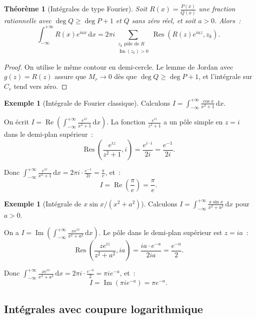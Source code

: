 \documentclass[12pt,a4paper,openany]{book}
\theoremstyle{definition}
\newtheorem{exemple}[definition]{Exemple}
\theoremstyle{plain}
\newtheorem{theoreme}[definition]{Théorème}
\theoremstyle{remark}
\DeclareMathOperator{\re}{Re}
\DeclareMathOperator{\im}{Im}
\DeclareMathOperator{\Res}{Res}
\newcommand{\dd}{\mathrm{d}}
\begin{document}
\begin{theoreme}[Intégrales de type Fourier]\label{thm:int-fourier}
Soit $R(x) = \frac{P(x)}{Q(x)}$ une fraction rationnelle avec $\deg Q \geq \deg P + 1$
et $Q$ sans zéro réel, et soit $a > 0$. Alors~:
\[
  \int_{-\infty}^{+\infty} R(x) e^{iax}\, \dd x
  = 2\pi i \sum_{\substack{z_k \text{ pôle de } R \\ \im(z_k) > 0}} \Res(R(z) e^{iaz}, z_k).
\]
\end{theoreme}

\begin{proof}
On utilise le même contour en demi-cercle. Le lemme de Jordan avec
$g(z) = R(z)$ assure que $M_r \to 0$ dès que $\deg Q \geq \deg P + 1$,
et l'intégrale sur $C_r$ tend vers zéro.
\end{proof}

\begin{exemple}[Intégrale de Fourier classique]\label{ex:fourier-1}
Calculons $\displaystyle I = \int_{-\infty}^{+\infty} \frac{\cos x}{x^2 + 1}\, \dd x$.

On écrit $I = \re\!\left(\int_{-\infty}^{+\infty} \frac{e^{ix}}{x^2+1}\, \dd x\right)$.
La fonction $\frac{e^{iz}}{z^2+1}$ a un pôle simple en $z = i$ dans le demi-plan supérieur~:
\[
  \Res\!\left(\frac{e^{iz}}{z^2+1}, i\right) = \frac{e^{i \cdot i}}{2i} = \frac{e^{-1}}{2i}.
\]

Donc $\int_{-\infty}^{+\infty} \frac{e^{ix}}{x^2+1}\, \dd x = 2\pi i \cdot \frac{e^{-1}}{2i} = \frac{\pi}{e}$, et~:
\[
  I = \re\!\left(\frac{\pi}{e}\right) = \frac{\pi}{e}.
\]
\end{exemple}

\begin{exemple}[Intégrale de $x\sin x/(x^2+a^2)$]\label{ex:fourier-2}
Calculons $\displaystyle I = \int_{-\infty}^{+\infty} \frac{x\sin x}{x^2 + a^2}\, \dd x$
pour $a > 0$.

On a $I = \im\!\left(\int_{-\infty}^{+\infty} \frac{xe^{ix}}{x^2+a^2}\,\dd x\right)$.
Le pôle dans le demi-plan supérieur est $z = ia$~:
\[
  \Res\!\left(\frac{ze^{iz}}{z^2+a^2}, ia\right)
  = \frac{ia \cdot e^{-a}}{2ia} = \frac{e^{-a}}{2}.
\]

Donc $\int_{-\infty}^{+\infty} \frac{xe^{ix}}{x^2+a^2}\,\dd x = 2\pi i \cdot \frac{e^{-a}}{2} = \pi i e^{-a}$, et~:
\[
  I = \im(\pi i e^{-a}) = \pi e^{-a}.
\]
\end{exemple}

\subsection{Intégrales avec coupure logarithmique}\label{subsec:int-log}
\end{document}
